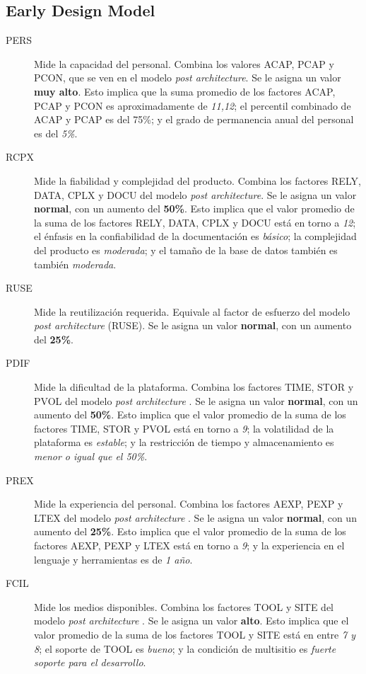 \documentclass[11pt,a4paper,spanish,twoside]{book}
\begin{document}
\subsection{Early Design Model}
\begin{description}
\item[PERS] Mide la capacidad del personal. Combina los valores ACAP, PCAP y
PCON, que se ven en el modelo \emph{post architecture}. Se le asigna un
valor \textbf{muy alto}. Esto implica que la suma promedio de los factores
ACAP, PCAP y PCON es aproximadamente de \emph{11,12}; el percentil combinado
de ACAP y PCAP es del 75\%; y el grado de permanencia anual del personal es
del \emph{5\%}.

\item[RCPX] Mide la fiabilidad y complejidad del producto. Combina los
factores RELY, DATA, CPLX y DOCU del modelo \emph{post architecture}. Se le
asigna un valor \textbf{normal}, con un aumento del \textbf{50\%}. Esto
implica que el valor promedio de la suma de los factores RELY, DATA, CPLX y
DOCU está en torno a \emph{12}; el énfasis en la confiabilidad de la
documentación es \emph{básico}; la complejidad del producto es
\emph{moderada}; y el tamaño de la base de datos también es también
\emph{moderada}.

\item[RUSE] Mide la reutilización requerida. Equivale al factor de esfuerzo
del modelo \emph{post architecture} (RUSE). Se le asigna un valor
\textbf{normal}, con un aumento del \textbf{25\%}.

\item[PDIF] Mide la dificultad de la plataforma. Combina los factores TIME, 
STOR y PVOL del modelo \emph{post architecture} . Se le asigna un valor
\textbf{normal}, con un aumento del \textbf{50\%}. Esto implica que el valor 
promedio de la suma de los factores TIME, STOR y PVOL está en torno a \emph{9};
la volatilidad de la plataforma es \emph{estable}; y la restricción de tiempo y
almacenamiento es \emph{menor o igual que el 50\%}.

\item[PREX] Mide la experiencia del personal. Combina los factores AEXP, PEXP y
LTEX del modelo \emph{post architecture} . Se le asigna un valor 
\textbf{normal}, con un aumento del \textbf{25\%}. Esto implica que el valor 
promedio de la suma de los factores AEXP, PEXP y LTEX está en torno a \emph{9};
y la experiencia en el lenguaje y herramientas es de \emph{1 año}.

\item[FCIL] Mide los medios disponibles. Combina los factores TOOL y SITE del 
modelo \emph{post architecture} . Se le asigna un valor \textbf{alto}. Esto 
implica que el valor promedio de la suma de los factores TOOL y SITE está en 
entre \emph{7 y 8}; el soporte de TOOL es \emph{bueno}; y la condición de 
multisitio es \emph{fuerte soporte para el desarrollo}.

\end{description}
\end{document}
